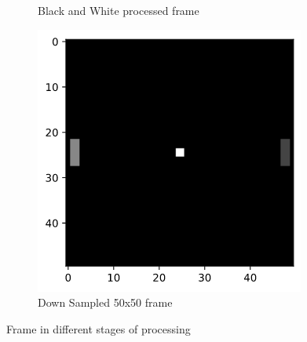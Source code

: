 \begin{figure}[h!]
\begin{subfigure}{0.49\textwidth}
        \caption{Black and White processed frame}
        \label{fig-bw}
    \end{subfigure}

    \begin{subfigure}{0.49\textwidth}
        \centering
        \includegraphics[width=\textwidth]{figures/small.png}
        \caption{Down Sampled 50x50 frame}
    \end{subfigure}
    \caption{Frame in different stages of processing}
    \label{fig-small}
    \label{fig-process}
\end{figure}